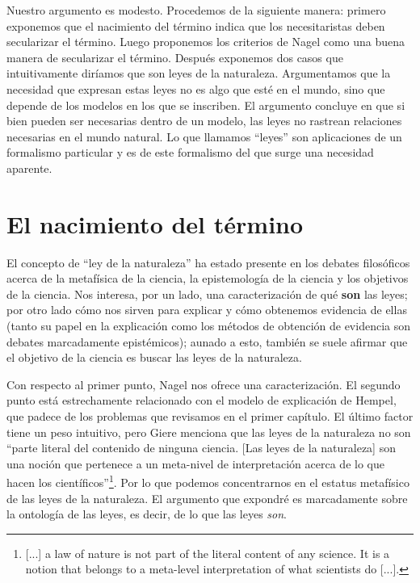 Nuestro argumento es modesto. Procedemos de la siguiente manera: primero exponemos que el nacimiento del término indica que los necesitaristas deben secularizar el término. Luego proponemos los criterios de Nagel como una buena manera de secularizar el término. Después exponemos dos casos que intuitivamente diríamos que son leyes de la naturaleza. Argumentamos que la necesidad que expresan estas leyes no es algo que esté en el mundo, sino que depende de los modelos en los que se inscriben. El argumento concluye en que si bien pueden ser necesarias dentro de un modelo, las leyes no rastrean relaciones necesarias en el mundo natural. Lo que llamamos ``leyes'' son aplicaciones de un formalismo particular y es de este formalismo del que surge una necesidad aparente.

\section{El nacimiento del término}

\noindent El concepto de ``ley de la naturaleza'' ha estado presente en los debates filosóficos acerca de la metafísica de la ciencia, la epistemología de la ciencia y los objetivos de la ciencia. Nos interesa, por un lado, una caracterización de qué \textbf{son} las leyes; por otro lado cómo nos sirven para explicar y cómo obtenemos evidencia de ellas (tanto su papel en la explicación como los métodos de obtención de evidencia son debates marcadamente epistémicos); aunado a esto, también se suele afirmar que el objetivo de la ciencia es buscar las leyes de la naturaleza.

Con respecto al primer punto, Nagel nos ofrece una caracterización. El segundo punto está estrechamente relacionado con el modelo de explicación de Hempel, que padece de los problemas que revisamos en el primer capítulo. El último factor tiene un peso intuitivo, pero Giere \citeyear[p. 69]{Giere2006} menciona que las leyes de la naturaleza no son ``parte literal del contenido de ninguna ciencia. [Las leyes de la naturaleza] son una noción que pertenece a un meta-nivel de interpretación acerca de lo que hacen los científicos''\footnote{[...] a law of nature is not part of the literal content of any science. It is a notion that belongs to a meta-level interpretation of what scientists do [...].}. Por lo que podemos concentrarnos en el estatus metafísico de las leyes de la naturaleza. El argumento que expondré es marcadamente sobre la ontología de las leyes, es decir, de lo que las leyes \textit{son}.


